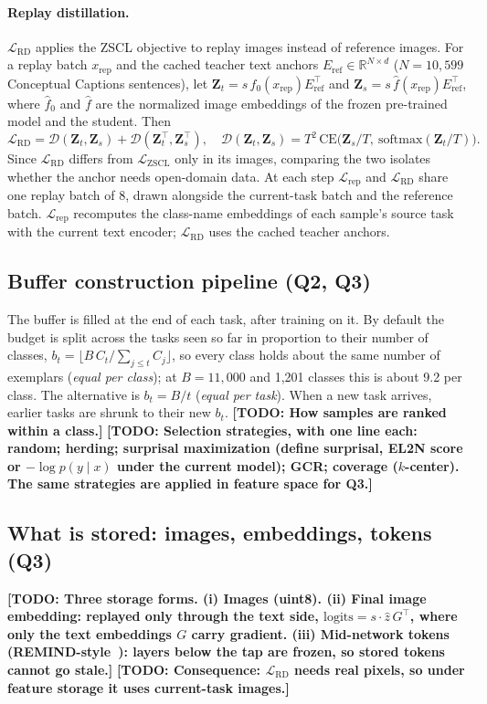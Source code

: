 \documentclass[10pt,twocolumn,letterpaper]{article}
\newcommand{\TODO}[1]{\textbf{\color{red}[TODO: #1]}}
\newcommand{\Q}[1]{\textbf{Q#1}\xspace}     %
\newcommand{\Lrep}{\mathcal{L}_{\text{rep}}}
\newcommand{\Lzscl}{\mathcal{L}_{\text{ZSCL}}}
\newcommand{\Lrd}{\mathcal{L}_{\text{RD}}}
\begin{document}
\paragraph{Replay distillation.}
$\Lrd$ applies the ZSCL objective to replay images instead of reference images.
For a replay batch $x_{\text{rep}}$ and the cached teacher text anchors
$E_{\text{ref}}\in\mathbb{R}^{N\times d}$ ($N{=}10{,}599$ Conceptual Captions
sentences), let $\mathbf{Z}_t = s\,\hat f_0(x_{\text{rep}})E_{\text{ref}}^\top$
and $\mathbf{Z}_s = s\,\hat f(x_{\text{rep}})E_{\text{ref}}^\top$, where
$\hat f_0$ and $\hat f$ are the normalized image embeddings of the frozen
pre-trained model and the student. Then
\begin{equation}
  \Lrd = \mathcal{D}(\mathbf{Z}_t,\mathbf{Z}_s) + \mathcal{D}(\mathbf{Z}_t^\top,\mathbf{Z}_s^\top),
  \quad
  \mathcal{D}(\mathbf{Z}_t,\mathbf{Z}_s)=T^2\,\mathrm{CE}\big(\mathbf{Z}_s/T,\ \mathrm{softmax}(\mathbf{Z}_t/T)\big).
  \label{eq:rd}
\end{equation}
Since $\Lrd$ differs from $\Lzscl$ only in its images, comparing the two
isolates whether the anchor needs open-domain data. At each step $\Lrep$ and
$\Lrd$ share one replay batch of 8, drawn alongside the current-task batch and
the reference batch. $\Lrep$ recomputes the class-name embeddings of each
sample's source task with the current text encoder; $\Lrd$ uses the cached
teacher anchors.

\subsection{Buffer construction pipeline (\Q{2}, \Q{3})}
\label{sec:method-pipeline}
The buffer is filled at the end of each task, after training on it. By default
the budget is split across the tasks seen so far in proportion to their number
of classes, $b_t=\lfloor B\,C_t/\sum_{j\le t}C_j\rfloor$, so every class holds
about the same number of exemplars (\emph{equal per class}); at $B{=}11{,}000$
and 1{,}201 classes this is about 9.2 per class. The alternative is
$b_t=B/t$ (\emph{equal per task}). When a new task arrives, earlier tasks are
shrunk to their new $b_t$.
\TODO{How samples are ranked within a class.}
\TODO{Selection strategies, with one line each: random; herding; surprisal maximization (define surprisal, \eg EL2N score or $-\log p(y\mid x)$ under the current model); GCR; coverage ($k$-center). The same strategies are applied in feature space for \Q{3}.}

\subsection{What is stored: images, embeddings, tokens (\Q{3})}
\label{sec:method-storage}
\TODO{Three storage forms. (i) Images (uint8). (ii) Final image embedding: replayed only through the text side, $\text{logits} = s \cdot \hat{z} \, G^\top$, where only the text embeddings $G$ carry gradient. (iii) Mid-network tokens (REMIND-style~\cite{hayes2020remind}): layers below the tap are frozen, so stored tokens cannot go stale.}
\TODO{Consequence: $\Lrd$ needs real pixels, so under feature storage it uses current-task images.}
\end{document}
